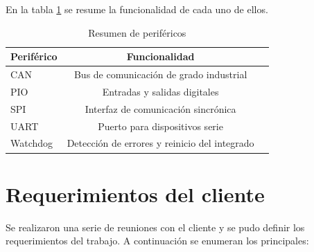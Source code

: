 En la tabla \ref{tab:perifericosresumen} se resume la funcionalidad de cada uno de ellos.

\begin{table}[h]
	\centering
	\caption[Resumen de periféricos]{Resumen de periféricos}
	\begin{tabular}{l c c}    
		\toprule
        \textbf{Periférico} & \textbf{Funcionalidad}\\
		\midrule
		CAN                 & Bus de comunicación de grado industrial\\        	
		PIO                 & Entradas y salidas digitales\\
		SPI                 & Interfaz de comunicación sincrónica\\
		UART                & Puerto para dispositivos serie\\
		Watchdog            & Detección de errores y reinicio del integrado\\
		\bottomrule
		\hline
	\end{tabular}
	\label{tab:perifericosresumen}
\end{table}

\newpage

\section{Requerimientos del cliente}
\label{sec:emphuerimientos}

Se realizaron una serie de reuniones con el cliente y se pudo definir los requerimientos del trabajo.
A continuación se enumeran los principales:

